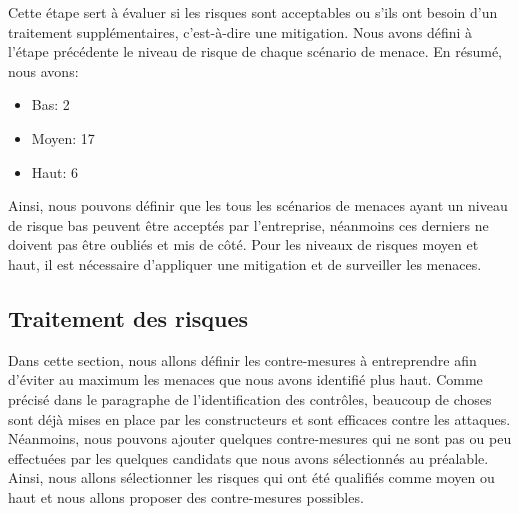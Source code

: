 Cette étape sert à évaluer si les risques sont acceptables ou s'ils ont besoin d'un traitement supplémentaires, c'est-à-dire une mitigation. Nous avons défini à l'étape précédente le niveau de risque de chaque scénario de menace. En résumé, nous avons:

\begin{itemize}
	\item Bas: 2
	\item Moyen: 17
	\item Haut: 6
\end{itemize} 

Ainsi, nous pouvons définir que les tous les scénarios de menaces ayant un niveau de risque bas peuvent être acceptés par l'entreprise, néanmoins ces derniers ne doivent pas être oubliés et mis de côté. Pour les niveaux de risques moyen et haut, il est nécessaire d'appliquer une mitigation et de surveiller les menaces. 

\subsection{Traitement des risques}
Dans cette section, nous allons définir les contre-mesures à entreprendre afin d'éviter au maximum les menaces que nous avons identifié plus haut. Comme précisé dans le paragraphe de l'identification des contrôles, beaucoup de choses sont déjà mises en place par les constructeurs et sont efficaces contre les attaques. Néanmoins, nous pouvons ajouter quelques contre-mesures qui ne sont pas ou peu effectuées par les quelques candidats que nous avons sélectionnés au préalable. Ainsi, nous allons sélectionner les risques qui ont été qualifiés comme moyen ou haut et nous allons proposer des contre-mesures possibles.

